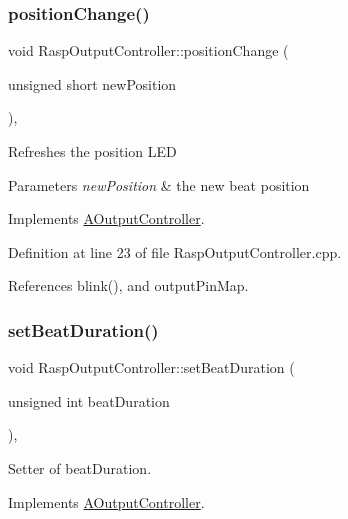 \subsubsection{\texorpdfstring{position\+Change()}{positionChange()}}
{\footnotesize\ttfamily void Rasp\+Output\+Controller\+::position\+Change (\begin{DoxyParamCaption}\item[{unsigned short}]{new\+Position }\end{DoxyParamCaption})\hspace{0.3cm}{\ttfamily [override]}, {\ttfamily [virtual]}}

Refreshes the position L\+ED 
\begin{DoxyParams}{Parameters}
{\em new\+Position} & the new beat position \\
\hline
\end{DoxyParams}


Implements \hyperlink{class_a_output_controller_a5a818a40e2911411d378032b8b2fb6c8}{A\+Output\+Controller}.



Definition at line 23 of file Rasp\+Output\+Controller.\+cpp.



References blink(), and output\+Pin\+Map.

\mbox{\label{class_rasp_output_controller_a5fd551f1aba056356befd71e5bff23f1}} 
\subsubsection{\texorpdfstring{set\+Beat\+Duration()}{setBeatDuration()}}
{\footnotesize\ttfamily void Rasp\+Output\+Controller\+::set\+Beat\+Duration (\begin{DoxyParamCaption}\item[{unsigned int}]{beat\+Duration }\end{DoxyParamCaption})\hspace{0.3cm}{\ttfamily [override]}, {\ttfamily [virtual]}}



Setter of beat\+Duration. 



Implements \hyperlink{class_a_output_controller_ac685432fc57d2441ecb548386554d2c9}{A\+Output\+Controller}.



